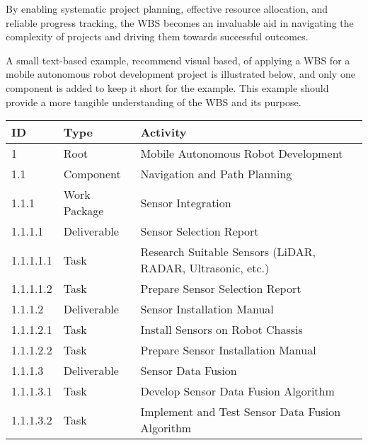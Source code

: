 \documentclass[10pt]{projectdoc}
\begin{document}
By enabling systematic project planning, effective resource allocation, and reliable progress tracking, the WBS becomes an invaluable aid in navigating the complexity of projects and driving them towards successful outcomes.

A small text-based example, recommend visual based, of applying a WBS for a mobile autonomous robot development project is illustrated below, and only one component is added to keep it short for the example. This example should provide a more tangible understanding of the WBS and its purpose.

\begin{table}[H]
    \centering
    \begin{tabular}{|l|l|l|}
    \hline
    \textbf{\textbf{ID}} & \textbf{Type} & \textbf{Activity}                                          \\ \hline
    1                    & Root          & Mobile Autonomous Robot Development                        \\ \hline
    1.1                  & Component     & Navigation and Path Planning                               \\ \hline
    1.1.1                & Work Package  & Sensor Integration                                         \\ \hline
    1.1.1.1              & Deliverable   & Sensor Selection Report                                    \\ \hline
    1.1.1.1.1            & Task          & Research Suitable Sensors (LiDAR, RADAR, Ultrasonic, etc.) \\ \hline
    1.1.1.1.2            & Task          & Prepare Sensor Selection Report                            \\ \hline
    1.1.1.2              & Deliverable   & Sensor Installation Manual                                 \\ \hline
    1.1.1.2.1            & Task          & Install Sensors on Robot Chassis                           \\ \hline
    1.1.1.2.2            & Task          & Prepare Sensor Installation Manual                         \\ \hline
    1.1.1.3              & Deliverable   & Sensor Data Fusion                                         \\ \hline
    1.1.1.3.1            & Task          & Develop Sensor Data Fusion Algorithm                       \\ \hline
    1.1.1.3.2            & Task          & Implement and Test Sensor Data Fusion Algorithm            \\ \hline

\end{tabular}
\end{table}
\end{document}
